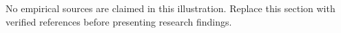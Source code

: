 No empirical sources are claimed in this illustration. Replace this section with verified references before presenting research findings.
